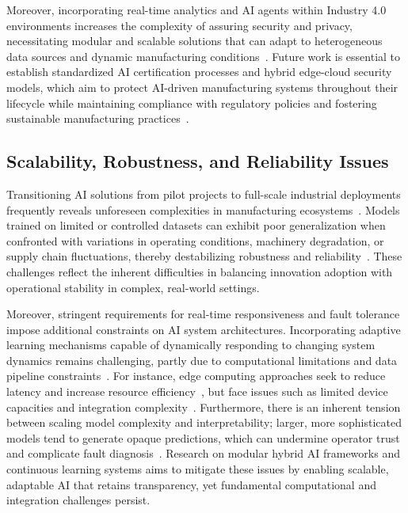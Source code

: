 \documentclass[sigconf]{acmart}
\begin{document}
Moreover, incorporating real-time analytics and AI agents within Industry 4.0 environments increases the complexity of assuring security and privacy, necessitating modular and scalable solutions that can adapt to heterogeneous data sources and dynamic manufacturing conditions~\cite{ref37}. Future work is essential to establish standardized AI certification processes and hybrid edge-cloud security models, which aim to protect AI-driven manufacturing systems throughout their lifecycle while maintaining compliance with regulatory policies and fostering sustainable manufacturing practices~\cite{ref41}.

\subsection{Scalability, Robustness, and Reliability Issues}

Transitioning AI solutions from pilot projects to full-scale industrial deployments frequently reveals unforeseen complexities in manufacturing ecosystems~\cite{ref16,ref19}. Models trained on limited or controlled datasets can exhibit poor generalization when confronted with variations in operating conditions, machinery degradation, or supply chain fluctuations, thereby destabilizing robustness and reliability~\cite{ref6,ref20}. These challenges reflect the inherent difficulties in balancing innovation adoption with operational stability in complex, real-world settings.

Moreover, stringent requirements for real-time responsiveness and fault tolerance impose additional constraints on AI system architectures. Incorporating adaptive learning mechanisms capable of dynamically responding to changing system dynamics remains challenging, partly due to computational limitations and data pipeline constraints~\cite{ref31,ref32}. For instance, edge computing approaches seek to reduce latency and increase resource efficiency~\cite{ref31}, but face issues such as limited device capacities and integration complexity~\cite{ref32}. Furthermore, there is an inherent tension between scaling model complexity and interpretability; larger, more sophisticated models tend to generate opaque predictions, which can undermine operator trust and complicate fault diagnosis~\cite{ref2}. Research on modular hybrid AI frameworks and continuous learning systems aims to mitigate these issues by enabling scalable, adaptable AI that retains transparency, yet fundamental computational and integration challenges persist.
\end{document}

